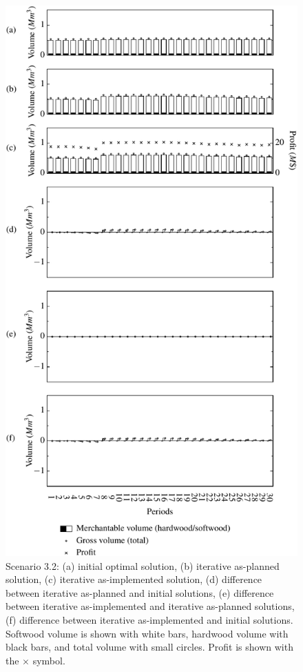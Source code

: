 \begin{figure}[ht!]
  \caption{Scenario 3.2: (a) initial optimal solution, (b) iterative
    as-planned solution, (c) iterative as-implemented solution, (d)
    difference between iterative as-planned and initial solutions, (e)
    difference between iterative as-implemented and iterative
    as-planned solutions, (f) difference between iterative
    as-implemented and initial solutions. Softwood volume is shown
    with white bars, hardwood volume with black bars, and total volume
    with small circles. Profit is shown with the
    $\times$ symbol.}
  \label{fig:scenario3.2}
  \medskip
  \centering
  \includegraphics[width=0.65\columnwidth]{images/s3-2}
\end{figure}

